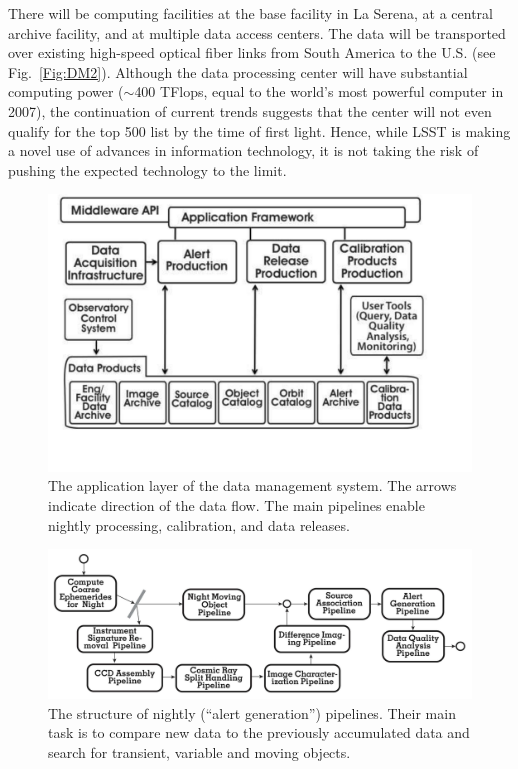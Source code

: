 \documentclass{emulateapj}
\begin{document}
There will be computing facilities at the base facility in La Serena,
at a central archive facility, and at multiple data access 
centers. The data will be transported over existing high-speed optical fiber 
links from South America to the U.S. (see Fig.~\ref{Fig:DM2}).
Although the data processing center will have substantial computing power ($\sim$400 
TFlops, equal to the world's most powerful computer in 2007), the continuation of 
current trends suggests that the center will 
not even qualify for the top 500 list by the time of first light.
Hence, while LSST is making a novel use of advances in information technology, 
it is not taking the risk of pushing the expected technology to the limit.  


\begin{figure}[t!]
\hskip -0.1in
\includegraphics[width=1.15\hsize,clip]{DMp2.pdf}
\vskip -0.3in
\caption{The application layer of the data management system. The arrows indicate
direction of the data flow. The main pipelines enable nightly processing,
calibration, and data releases.} 
\label{Fig:DM4}
\end{figure}

\begin{figure}
\includegraphics[width=1.0\hsize,clip]{DMp4.pdf}
\caption{The structure of nightly (``alert generation'') pipelines. 
Their main task is to compare new data to the previously accumulated data and search for 
transient, variable and moving objects.} 
\label{Fig:DM5}
\end{figure}
\end{document}
